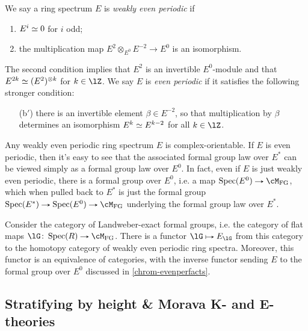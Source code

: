 \begin{definition}
  \label{chrom-evenper}
  We say a ring spectrum $E$ is \emph{weakly even periodic} if
  \begin{enumerate}
  \item $E^i \simeq 0$ for $i$ odd;
  \item the multiplication map $E^2 \otimes_{E^0} E^{-2} \to E^0$ is
    an isomorphism.
  \end{enumerate}
  The second condition implies that $E^2$ is an invertible
  $E^0$-module and that $E^{2k} \simeq (E^2)^{\otimes k}$ for
  $k \in \lZ$. We say $E$ is \emph{even periodic} if it satisfies the
  following stronger condition:
  \begin{enumerate}
  \item[(b$'$)] there is an invertible element $\beta \in E^{-2}$, so
    that multiplication by $\beta$ determines an isomorphism
    $E^k \simeq E^{k-2}$ for all $k \in \lZ$.
  \end{enumerate}
\end{definition}

\begin{remark}
  \label{chrom-evenperfacts}
  Any weakly even periodic ring spectrum $E$ is complex-orientable. If
  $E$ is even periodic, then it's easy to see that the associated
  formal group law over $E^*$ can be viewed simply as a formal group
  law over $E^0$. In fact, even if $E$ is just weakly even periodic,
  there is a formal group over $E^0$, i.e. a map
  $\Spec(E^0) \to \cM_\FG$, which when pulled back to $E^*$ is just
  the formal group $\Spec(E^*) \to \Spec(E^0) \to \cM_\FG$ underlying
  the formal group law over $E^*$.
\end{remark}

\begin{proposition}
  \label{chrom-evenperfg}
  Consider the category of Landweber-exact formal groups, i.e. the
  category of flat maps $\lG \c \Spec(R) \to \cM_\FG$. There is a
  functor $\lG \mapsto E_\lG$ from this category to the homotopy
  category of weakly even periodic ring spectra. Moreover, this
  functor is an equivalence of categories, with the inverse functor
  sending $E$ to the formal group over $E^0$ discussed in
  \cref{chrom-evenperfacts}.
\end{proposition}


\subsection{Stratifying by height \& Morava K- and E-theories}
\label{chrom-strat}

